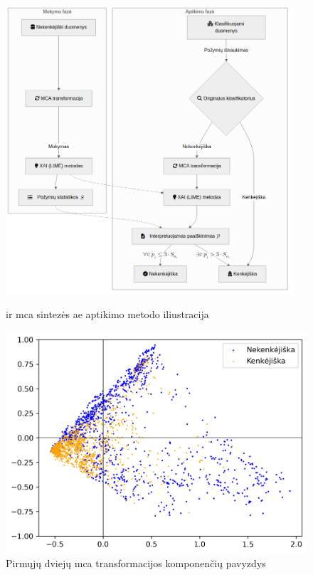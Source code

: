 \begin{figure}[h]
    \captionsetup{justification=centering}
    \begin{minipage}{0.48\textwidth}
        \includegraphics[width=0.95\textwidth]{images/original.png}
        \caption{\LIME ir \gls{mca} sintezės \gls{ae} aptikimo metodo iliustracija}
        \label{fig:original}
    \end{minipage}
    \begin{minipage}{0.48\textwidth}
        \centering
        \includegraphics[width=\textwidth]{images/mca_scatter.png}
        \caption{Pirmųjų dviejų \gls{mca} transformacijos komponenčių pavyzdys}
        \label{fig:scree}
    \end{minipage}
\end{figure}


